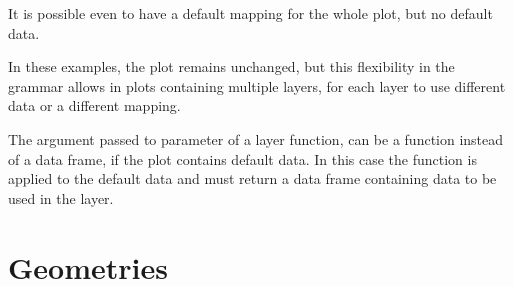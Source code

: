 \documentclass[krantz2]{krantz}\usepackage{knitr}%
\begin{document}
It is possible even to have a default mapping for the whole plot, but no default data.

\begin{knitrout}\footnotesize
{}\color{fgcolor}\begin{kframe}
\begin{alltt}
\hlstd{()} \hlopt{+}
  \hlstd{(}    \hlopt{+}
  \hlstd{(} 
\end{alltt}
\end{kframe}
\end{knitrout}

In these examples, the plot remains unchanged, but this flexibility in the grammar allows in plots containing multiple layers, for each layer to use different data or a different mapping.

\begin{explainbox}
The argument passed to parameter  of a layer function, can be a function instead of a data frame, if the plot contains default data. In this case the function is applied to the default data and must return a data frame containing data to be used in the layer.

\begin{knitrout}\footnotesize
{}\color{fgcolor}\begin{kframe}
\begin{alltt}
\hlstd{(} 
        \hlstd{=} \hlstd{(}    \hlopt{+}
  \hlstd{(} \hlstd{=} \hlstd{)} \hlopt{+}
  \hlstd{(} \hlstd{=} \hlstd{(}\hlstd{)\{} \hlopt{==} \hlstd{)\},}  \hlstd{=} \hlstd{,}  \hlstd{=} \hlstd{)}
\end{alltt}
\end{kframe}
\end{knitrout}
\end{explainbox}

\section{Geometries}\label{sec:plot:geometries}
\end{document}
